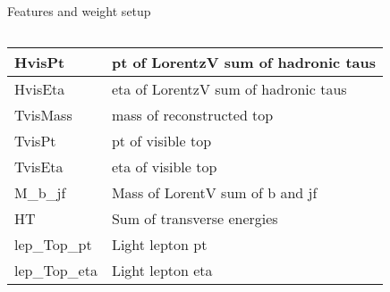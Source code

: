 \begin{frame}{Features and weight setup}
\begin{columns}
\begin{column}{0.5\textwidth}
{\begin{tabular}{|l|l|}
                 HvisPt           & pt of LorentzV sum of hadronic taus      \\ \hline
                 HvisEta          & eta of LorentzV sum of hadronic taus      \\ \hline
                 TvisMass         & mass of reconstructed top             \\ \hline
                 TvisPt           & pt of visible top                     \\ \hline
                 TvisEta          & eta of visible top                    \\ \hline
                 M\_b\_jf         & Mass of LorentV sum of b and jf       \\ \hline
                 HT               & Sum of transverse energies            \\ \hline
                 lep\_Top\_pt     & Light lepton pt                       \\ \hline
                 lep\_Top\_eta    & Light lepton eta                      \\ \hline
             \end{tabular}}
        \end{column}
    \end{columns}
\end{frame}
  


